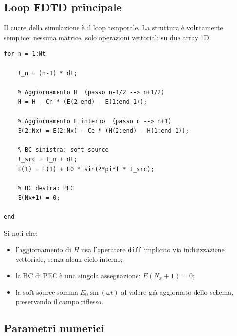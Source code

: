 \documentclass[a4paper, 11pt]{article}
\begin{document}
\subsection{Loop FDTD principale}

Il cuore della simulazione è il loop temporale. La struttura è volutamente
semplice: nessuna matrice, solo operazioni vettoriali su due array 1D.

\begin{lstlisting}[style=matlab, caption={Nucleo del loop FDTD (sezione 8 dello script)}]
for n = 1:Nt

    t_n = (n-1) * dt;

    % Aggiornamento H  (passo n-1/2 --> n+1/2)
    H = H - Ch * (E(2:end) - E(1:end-1));

    % Aggiornamento E interno  (passo n --> n+1)
    E(2:Nx) = E(2:Nx) - Ce * (H(2:end) - H(1:end-1));

    % BC sinistra: soft source
    t_src = t_n + dt;
    E(1) = E(1) + E0 * sin(2*pi*f * t_src);

    % BC destra: PEC
    E(Nx+1) = 0;

end
\end{lstlisting}

Si noti che:
\begin{itemize}
    \item l'aggiornamento di $H$ usa l'operatore \texttt{diff} implicito
          via indicizzazione vettoriale, senza alcun ciclo interno;
    \item la BC di PEC è una singola assegnazione: $E(N_x+1) = 0$;
    \item la soft source somma $E_0\sin(\omega t)$ al valore già aggiornato
          dello schema, preservando il campo riflesso.
\end{itemize}

\subsection{Parametri numerici}
\end{document}

